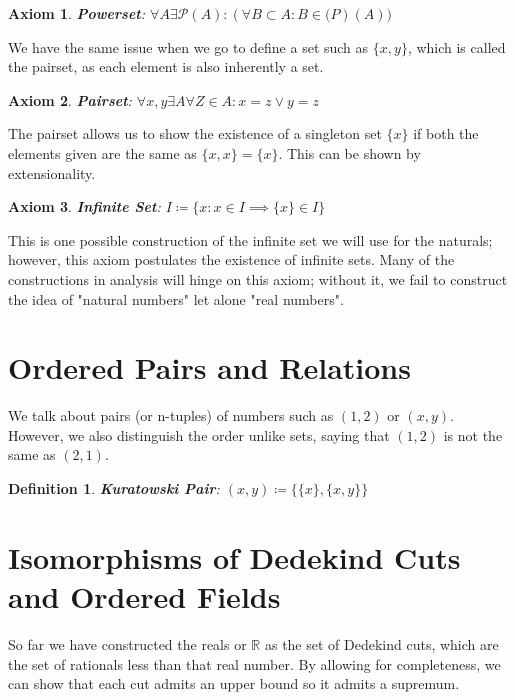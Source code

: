 \documentclass{article}
\newtheorem{defn}{Definition}[section]
\newtheorem{axm}{Axiom}[section]
\begin{document}
\begin{axm}
    \textbf{Powerset}: $\forall A \exists \mathcal{P}(A): (\forall B \subset A: B \in \mathcal(P)(A))$
\end{axm}
We have the same issue when we go to define a set such as $\{x, y\}$, which is called the pairset, as each element is also inherently a set.\\

\begin{axm}
    \textbf{Pairset}: $\forall x, y \exists A \forall Z \in A: x = z \lor y = z$
\end{axm}
The pairset allows us to show the existence of a singleton set $\{x\}$ if both the elements given are the same as $\{x, x\} = \{x\}$. This can be shown by extensionality.\\

\begin{axm}
    \textbf{Infinite Set}: $I \coloneq \{x: x \in I \implies \{x\} \in I\}$
\end{axm}
This is one possible construction of the infinite set we will use for the naturals; however, this axiom postulates the existence of infinite sets. Many of the constructions in analysis will hinge on this axiom; without it, we fail to construct the idea of "natural numbers" let alone "real numbers".\\
\pagebreak


\section{Ordered Pairs and Relations}
We talk about pairs (or n-tuples) of numbers such as $(1, 2)$ or $(x, y)$. However, we also distinguish the order unlike sets, saying that $(1, 2)$ is not the same as $(2, 1)$.\\

\begin{defn}
    \textbf{Kuratowski Pair}: $(x, y) \coloneq \{\{x\}, \{x, y\}\}$
\end{defn}
\pagebreak

\section{Isomorphisms of Dedekind Cuts and Ordered Fields}
So far we have constructed the reals or $\mathbb{R}$ as the set of Dedekind cuts, which are the set of rationals less than that real number. By allowing for completeness, we can show that each cut admits an upper bound so it admits a supremum.\\
\end{document}
